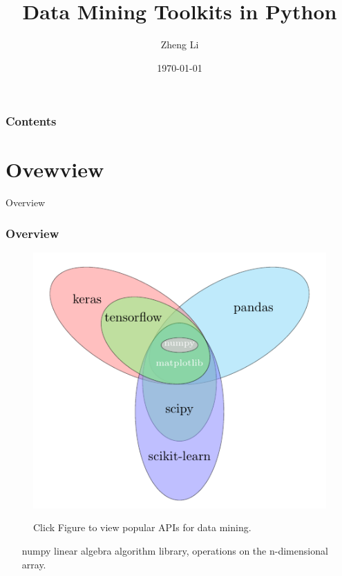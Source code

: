 \documentclass{beamer}
\title{Data Mining Toolkits in Python}
\author{Zheng Li}
\date{\today}
\begin{document}
\frame{\titlepage}


\begin{frame}
\frametitle{Contents}
\tableofcontents
\end{frame}


\section{Ovewview}

\begin{frame}{Overview}
\frametitle{Overview}
\noindent
\begin{minipage}{0.425\textwidth}
	\begin{figure}
		\href{./src/figures/toolkits_table.pdf}{
			\includegraphics[width=\linewidth]{./src/figures/toolkits_set.pdf}
		}
		\caption[10mm]{Click Figure to view popular APIs for data mining.}
	\end{figure}
\end{minipage}%
\hfill%
\begin{minipage}{0.5\textwidth}
	\begin{itemize}
		\item[numpy] linear algebra algorithm library, operations on the n-dimensional array.

\end{itemize}
\end{minipage}
\end{frame}
\end{document}

